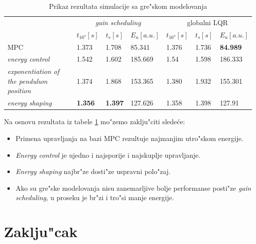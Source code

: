 \documentclass[a4paper,11pt]{article}
\theoremstyle{definition} \newtheorem{deff}{Definicija}[section]
\theoremstyle{definition} \newtheorem{prim}[deff]{Primer}
\theoremstyle{plain} \newtheorem{teor}[deff]{Teorema}
\begin{document}
	\begin{table}[!h]
		\begin{tabular}{lllllll}
			\cline{2-7}
			\multirow{2}{*}{} & \multicolumn{3}{c}{\emph{gain scheduling}} & \multicolumn{3}{c}{globalni LQR} \\ \cline{2-7} 
			& \multicolumn{1}{c}{$t_{16^o} [s]$} & \multicolumn{1}{c}{$t_s [s]$} & \multicolumn{1}{c}{$E_u [a.u.]$} & \multicolumn{1}{c}{$t_{16^o} [s]$} & \multicolumn{1}{c}{$t_s [s]$} & \multicolumn{1}{c}{$E_u [a.u.]$} \\ \hline
			MPC                
			& 1.373      & 1.708      & 85.341      & 1.376   & 1.736  & \textbf{84.989}
			\\ \hline
			\emph{energy control}
			&  1.542 & 1.602  & 185.669 & 1.54   & 1.598  & 186.333
			\\ \hline
			\emph{exponentiation of the pendulum position}
			& 1.374  & 1.868  & 153.365 & 1.380   & 1.932   & 155.301
			\\ \hline
			\emph{energy shaping}  
			& \textbf{1.356}  & \textbf{1.397}  &127.626 & 1.358   & 1.398  & 127.91
			\\ \hline
		\end{tabular}
		\caption{Prikaz rezultata simulacije sa gre"skom modelovanja }
		\label{tab:error}
	\end{table}
	
	Na osnovu rezultata iz tabele \ref{tab:error} mo"zemo zaklju"citi slede\'ce: 
	\begin{itemize}
		\item Primena upravljanja na bazi MPC rezultuje najmanjim utro"skom energije.
		\item \emph{Energy control} je ujedno i najsporije i najskuplje upravljanje.
		\item \emph{Energy shaping} najbr"ze dosti"ze uspravni polo"zaj.
		\item Ako su gre"ske modelovanja nisu zanemarljive bolje performanse posti"ze \emph{gain scheduling}, u proseku je br"zi i tro"si manje energije.
	\end{itemize}
	
	
	\clearpage
	\section{Zaklju"cak}\label{sec:zakljucak}
	
\end{document}
